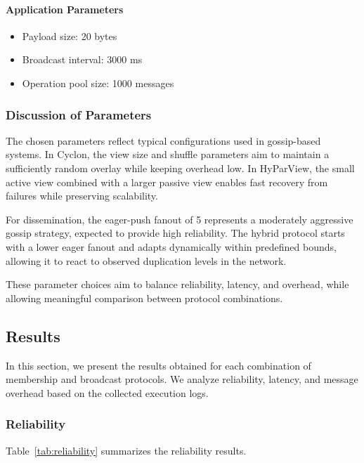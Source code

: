 \documentclass[sigconf,a4paper]{acmart}
\begin{document}
\paragraph{Application Parameters}

\begin{itemize}
    \item Payload size: 20 bytes
    \item Broadcast interval: 3000 ms
    \item Operation pool size: 1000 messages
\end{itemize}

\subsubsection{Discussion of Parameters}

The chosen parameters reflect typical configurations used in gossip-based
systems. In Cyclon, the view size and shuffle parameters aim to maintain
a sufficiently random overlay while keeping overhead low. In HyParView,
the small active view combined with a larger passive view enables fast
recovery from failures while preserving scalability.

For dissemination, the eager-push fanout of 5 represents a moderately
aggressive gossip strategy, expected to provide high reliability. The
hybrid protocol starts with a lower eager fanout and adapts dynamically
within predefined bounds, allowing it to react to observed duplication
levels in the network.

These parameter choices aim to balance reliability, latency, and overhead,
while allowing meaningful comparison between protocol combinations.

\subsection{Results}

In this section, we present the results obtained for each combination of
membership and broadcast protocols. We analyze reliability, latency, and
message overhead based on the collected execution logs.

\subsubsection{Reliability}

Table~\ref{tab:reliability} summarizes the reliability results.
\end{document}
